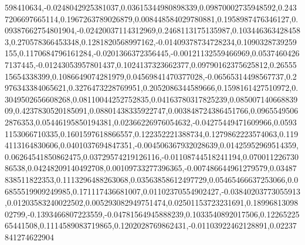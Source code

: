 598410634,-0.0248042925381037,0.03615344980898339,0.09870002735948592,0.2437206697665114,0.1967263789026879,0.008448584029780881,0.1958987476346127,0.09387662754801904,-0.02420037114312969,0.2468113175135987,0.1034463634284583,0.270578366453348,0.1281820568997162,-0.01409378734728234,0.1090328739259155,0.1170684796161284,-0.0201366372356445,-0.00121132559466969,0.05374604267137445,-0.01243053957801437,0.1024137323662377,0.09790162375625812,0.2655515654338399,0.1086649074281979,0.04569841470377028,-0.06565314498567737,0.2976343384065621,0.3276473228769951,0.2052086344589666,0.1598161427510972,0.3049502656608268,0.08110044252752835,0.04163780317825239,0.08500714066883909,0.4237830520185091,0.08801438335922747,0.003848724386451766,0.09655495062876353,0.05446195850194381,0.02366226976054632,-0.04275449471609966,0.05931153066710335,0.1601597618866557,0.122352221388734,0.1279862223574063,0.1194113164830606,0.0401037694847351,-0.004506367932028639,0.01425952969514359,0.06264541850862475,0.03729574219126116,-0.01108744518241194,0.07001122673086538,0.04248209140492708,0.00109733277396365,-0.007486644961279579,0.03487838511822353,0.1113296488263068,0.03563858612497729,0.05465466637253066,0.06855519909249985,0.171117436681007,0.01102370554902427,-0.03840203773055913,0.01203583240022502,0.005293082949751474,0.02501153723231691,0.1899681309802799,-0.1393466807223559,-0.04781564945888239,0.1033540892017506,0.1226522565441508,0.1114589083719865,0.1202028769862431,-0.01103922462128891,0.02237841274622904
